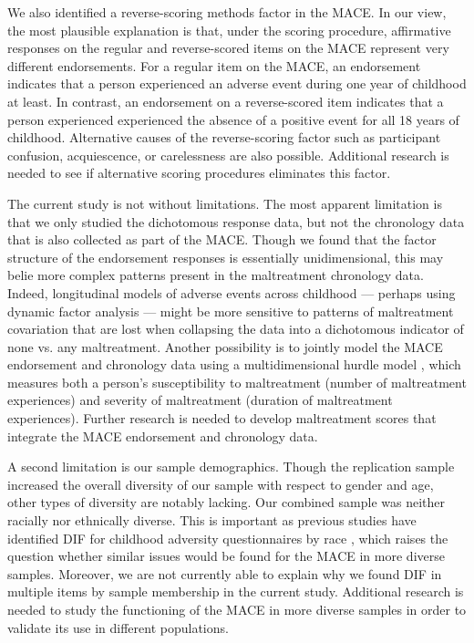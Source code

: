 \documentclass[letterpaper,man,natbib,noextraspace,floatsintext,longtable]{apa6}
\begin{document}
We also identified a reverse-scoring methods factor in the MACE. In our view, the most plausible explanation is that, under the \cite{teicher2015maltreatment} scoring procedure, affirmative responses on the regular and reverse-scored items on the MACE represent very different endorsements. For a regular item on the MACE, an endorsement indicates that a person experienced an adverse event during one year of childhood at least. In contrast, an endorsement on a reverse-scored item indicates that a person experienced experienced the absence of a positive event for all 18 years of childhood. Alternative causes of the reverse-scoring factor such as participant confusion, acquiescence, or carelessness \citep{weijters2013reversed} are also possible. Additional research is needed to see if alternative scoring procedures eliminates this factor. 

The current study is not without limitations. The most apparent limitation is that we only studied the dichotomous response data, but not the chronology data that is also collected as part of the MACE. Though we found that the factor structure of the endorsement responses is essentially unidimensional, this may belie more complex patterns present in the maltreatment chronology data. Indeed, longitudinal models of adverse events across childhood --- perhaps using dynamic factor analysis \citep{zhang2007bayesian} --- might be more sensitive to patterns of maltreatment covariation that are lost when collapsing the data into a dichotomous indicator of none vs. any maltreatment. Another possibility is to jointly model the MACE endorsement and chronology data using a multidimensional hurdle model \citep{magnus2021symptom}, which measures both a person's susceptibility to maltreatment (number of maltreatment experiences) and severity of maltreatment (duration of maltreatment experiences). Further research is needed to develop maltreatment scores that integrate the MACE endorsement and chronology data. 

A second limitation is our sample demographics. Though the replication sample increased the overall diversity of our sample with respect to gender and age, other types of diversity are notably lacking. Our combined sample was neither racially nor ethnically diverse. This is important as previous studies have identified DIF for childhood adversity questionnaires by race \citep{rodriguez2019identification}, which raises the question whether similar issues would be found for the MACE in more diverse samples. Moreover, we are not currently able to explain why we found DIF in multiple items by sample membership in the current study. Additional research is needed to study the functioning of the MACE in more diverse samples in order to validate its use in different populations. 
\end{document}
